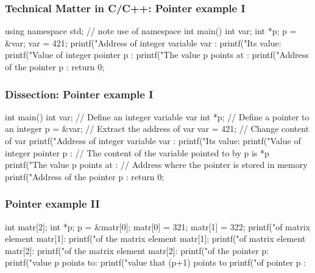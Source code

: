 \documentclass[handout]{beamer}
\newenvironment{block_mdfboxadmon}[1][]{\begin{block}{#1}}{\end{block}}
\begin{document}
\begin{frame}
\frametitle{Technical Matter in C/C++: Pointer example I}

\begin{block_mdfboxadmon}[]
\begin{print}
using namespace std; // note use of namespace
int main()
{
  int var;
  int *p;
  p = &var;
  var  = 421;
  printf("Address of integer variable var : %
  printf("Its value: %
  printf("Value of integer pointer p : %
  printf("The value p points at :  %
  printf("Address of the pointer p : %
  return 0;
}
\end{print}
\end{block_mdfboxadmon}
\end{frame}

\begin{frame}
\frametitle{Dissection: Pointer example I}

\begin{block_mdfboxadmon}[Discussion.]

\begin{print}
int main()
{
  int var;     // Define an integer variable var
  int *p;      // Define a pointer to an integer
  p = &var;    // Extract the address of var
  var = 421;   // Change content of var
  printf("Address of integer variable var : %
  printf("Its value: %
  printf("Value of integer pointer p : %
  // The content of the variable pointed to by p is *p
  printf("The value p points at :  %
  // Address where the pointer is stored in memory
  printf("Address of the pointer p : %
  return 0;
}
\end{print}
\end{block_mdfboxadmon}
\end{frame}

\begin{frame}
\frametitle{Pointer example II}

\begin{block_mdfboxadmon}[]
\begin{print}
int matr[2];
int *p;
p = &matr[0];
matr[0] = 321;
matr[1] = 322;
printf("\nAddress of matrix element matr[1]: %
printf("\nValue of the  matrix element  matr[1]; %
printf("\nAddress of matrix element matr[2]: %
printf("\nValue of the matrix element  matr[2]: %
printf("\nValue of the pointer p: %
printf("\nThe value p points to: %
printf("\nThe value that (p+1) points to  %
printf("\nAddress of pointer p : %
\end{print}
\end{block_mdfboxadmon}
\end{frame}
\end{document}
